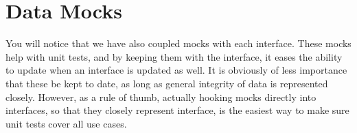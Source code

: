 

\section{Data Mocks}
You will notice that we have also coupled mocks with each interface. These mocks
help with unit tests, and by keeping them with the interface, it eases the
ability to update when an interface is updated as well. It is obviously of less
importance that these be kept to date, as long as general integrity of data
is represented closely. However, as a rule of thumb, actually hooking mocks
directly into interfaces, so that they closely represent interface, is the
easiest way to make sure unit tests cover all use cases.
